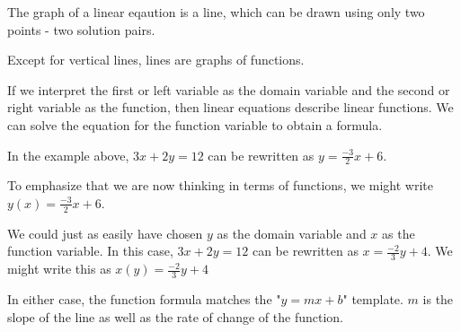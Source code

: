 \documentclass{ximera}
\begin{document}
\begin{example}
\begin{image}
\end{image}

The graph of a linear eqaution is a line, which can be drawn using only two points - two solution pairs.














\end{example}
Except for vertical lines, lines are graphs of functions.


If we interpret the first or left variable as the domain variable and the second or right variable as the function, then linear equations describe linear functions.  We can solve the equation for the function variable to obtain a formula.



In the example above, $3 x + 2 y = 12$ can be rewritten as $y = \tfrac{-3}{2} x + 6$.

To emphasize that we are now thinking in terms of functions, we might write $y(x) = \tfrac{-3}{2} x + 6$.




We could just as easily have chosen $y$ as the domain variable and $x$ as the function variable.  In this case, $3 x + 2 y = 12$ can be rewritten as $x = \tfrac{-2}{3} y + 4$.  We might write this as $x(y) = \tfrac{-2}{3} y + 4$




In either case, the function formula matches the "$y = m x + b$" template.  $m$ is the slope of the line as well as the rate of change of the function.
\end{document}
